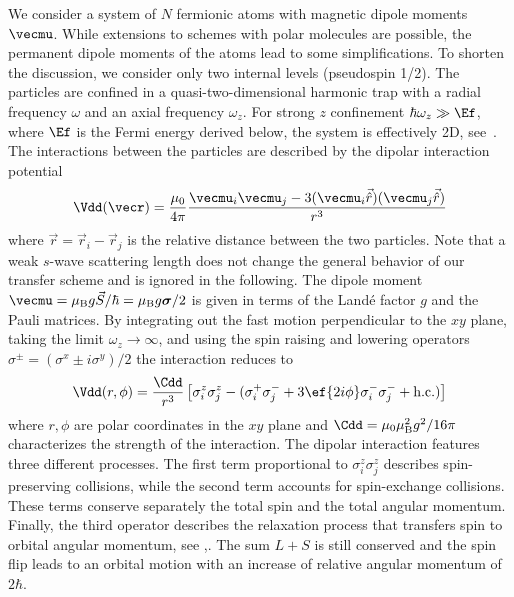 \noindent
We consider a system of $N$ fermionic atoms with magnetic dipole moments $\vecmu$. While extensions to schemes with polar molecules are possible, the permanent dipole moments of the atoms lead to some simplifications.
To shorten the discussion, we consider only two internal levels (pseudospin 1/2). The particles are confined in a quasi-two-dimensional harmonic trap with a radial frequency $\omega$ and an axial frequency $\omega_z$. For strong $z$ confinement $\hbar\omega_z \gg \Ef$, where $\Ef$ is the Fermi energy derived below, the system is effectively 2D, see~.
The interactions between the particles are described by the dipolar interaction potential
\begin{align*}
\Vdd(\vecr) = \frac{\mu_0}{4\pi}\frac{\vecmu_i  \vecmu_j - 3(\vecmu_i  \vec{\hat{r}})(\vecmu_j \vec{\hat{r}})}{r^3}
\end{align*}
where $\vec{r}=\vec{r}_i-\vec{r}_j$ is the relative distance between the two particles.
Note that a weak $s$-wave scattering length does not change the general behavior of our transfer scheme and is ignored in the following.
The dipole moment $\vecmu =  \mu_\text{B}g \vec{S} / \hbar = \mu_\text{B}g {\boldsymbol\sigma}/2$ is given in terms of the Land\'e factor $g$ and the Pauli matrices. By integrating out the fast motion perpendicular to the $xy$ plane, taking the limit $\omega_z\rightarrow\infty$, and using the spin raising and lowering operators $\sigma^{\pm} = (\sigma^x \pm i \sigma^y)/2$ the interaction reduces to
\begin{align*}
\Vdd(r,\phi) =  \frac{\Cdd}{r^3} \left[
\sigma^z_i \sigma^z_j - (\sigma^+_i \sigma^-_j +3 \ef{2i\phi} \sigma^-_i \sigma^-_j  +\text{h.c.})
\right]
\end{align*}
where $r,\phi$ are polar coordinates in the $xy$ plane and $\Cdd = \mu_0 \mu_\text{B}^2 g^2 / 16\pi$  characterizes the strength of the interaction. The dipolar interaction features three different processes. The first term proportional to $\sigma^z_i\sigma^z_j$ describes spin-preserving collisions, while the second term  accounts for spin-exchange collisions. These terms conserve separately the total spin and the total angular momentum.  Finally, the third operator  describes the relaxation process that transfers spin to orbital angular momentum, see ,. The sum $L+S$ is still conserved and the spin flip leads to an orbital motion with an increase of relative angular momentum of $2\hbar$.

